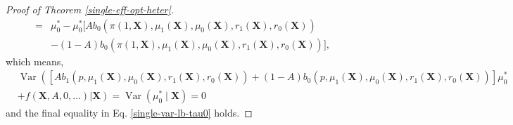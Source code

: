 \documentclass[11pt]{article}
\theoremstyle{referenceplain}
\theoremstyle{referencedefinition}
\theoremstyle{referenceremark}
\begin{document}
\begin{proof}[Proof of Theorem \ref{single-eff-opt-heter}]
\begin{align*}
        =&\mu_0^* - \mu_0^*[Ab_0(\pi(1,\mathbf{X}),\mu_1(\mathbf{X}),\mu_0(\mathbf{X}),r_1(\mathbf{X}),r_0(\mathbf{X}))\\
        &-(1-A)b_0(\pi(1,\mathbf{X}),\mu_1(\mathbf{X}),\mu_0(\mathbf{X}),r_1(\mathbf{X}),r_0(\mathbf{X}))],
\end{align*}
which means, 
\begin{align*}
    &\operatorname{Var}\left([Ab_1(p,\mu_1(\mathbf{X}),\mu_0(\mathbf{X}),r_1(\mathbf{X}),r_0(\mathbf{X})) + (1-A)b_0(p,\mu_1(\mathbf{X}),\mu_0(\mathbf{X}),r_1(\mathbf{X}),r_0(\mathbf{X}))]\mu_0^*\right.\\&+\left.f(\mathbf{X},A,0,\dots)\bigg|\mathbf{X}\right)=\operatorname{Var}(\mu_0^*\mid\mathbf{X})=0
\end{align*}
and the final equality in Eq. \eqref{single-var-lb-tau0} holds.


\end{proof}
\end{document}

